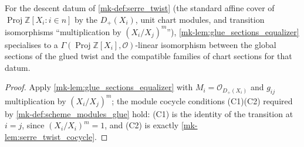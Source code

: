 \begin{lemma}
  \label{mk-lem:serre_twist_glued_sections}
  \leanok
  For the descent datum of \ref{mk-def:serre_twist} (the standard affine cover
  of \(\operatorname{Proj} \mathbb Z[X_i : i \in n]\) by the \(D_+(X_i)\),
  unit chart modules, and transition isomorphisms ``multiplication by
  \((X_i/X_j)^m\)''), \ref{mk-lem:glue_sections_equalizer} specialises to a
  \(\Gamma(\operatorname{Proj}\mathbb Z[X_i], \mathcal O)\)-linear
  isomorphism between the global sections of the glued twist and the
  compatible families of chart sections for that datum.
\end{lemma}
\begin{proof}
  \leanok{}
  Apply \ref{mk-lem:glue_sections_equalizer} with \(M_i = \mathcal
  O_{D_+(X_i)}\) and \(g_{ij}\) multiplication by \((X_i/X_j)^m\); the
  module cocycle conditions (C1)(C2) required by
  \ref{mk-def:scheme_modules_glue} hold: (C1) is the identity of the
  transition at \(i = j\), since \((X_i/X_i)^m = 1\), and (C2) is exactly
  \ref{mk-lem:serre_twist_cocycle}.
\end{proof}

